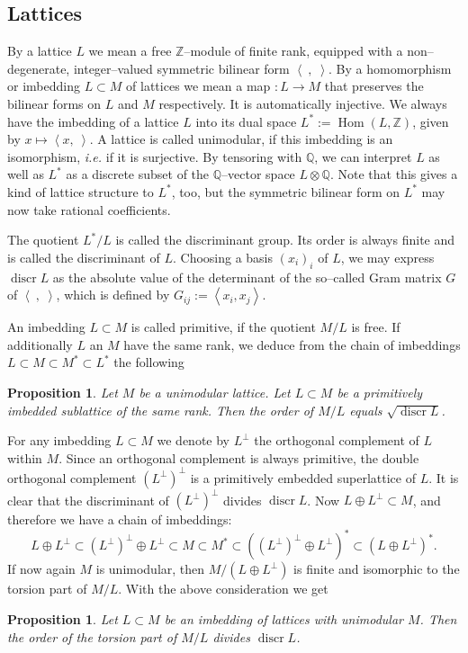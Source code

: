 \documentclass{amsart}
\DeclareMathOperator{\Hom}{Hom}
\DeclareMathOperator{\discr}{discr}
\newcommand{\ie}{{\it i.e. }}
\newcommand{\coloneqq}{:=}
\newcommand{\Q}{\mathbb{Q}}
\newcommand{\Z}{\mathbb{Z}}
\theoremstyle{plain}
\newtheorem{proposition}[theorem]{Proposition}
\theoremstyle{definition}
\theoremstyle{remark}
\begin{document}
\subsection{Lattices}\label{latticeSubsection} By a lattice $L$ we mean a free $\Z$--module of finite rank, equipped with a non--degenerate, integer--valued symmetric bilinear form $\left<\ ,\;\right>$. By a homomorphism or imbedding $L\subset M$ of lattices we mean a map $:L\rightarrow M$ that preserves the bilinear forms on $L$ and $M$ respectively. It is automatically injective. We always have the imbedding of a lattice $L$ into its dual space $L^*\coloneqq \Hom(L,\Z)$, given by $x \mapsto \left<x,\ \right>$. A lattice is called unimodular, if this imbedding is an isomorphism, \ie if it is surjective. By tensoring with $\Q$, we can interpret $L$ as well as $L^*$ as a discrete subset of the $\Q$--vector space $L\otimes \Q$. Note that this gives a kind of lattice structure to $L^*$, too, but the symmetric bilinear form on $L^*$ may now take rational coefficients.

The quotient $L^*/L$ is called the discriminant group. Its order is always finite and is called the discriminant of $L$.
Choosing a basis $(x_i)_i$ of $L$, we may express $\discr L$ as the absolute value of the determinant of the so--called Gram matrix $G$ of $\left<\ ,\;\right>$, which is defined by $G_{ij}\coloneqq \left<x_i,x_j\right>$. 

An imbedding $L\subset M$ is called primitive, if the quotient $M/L$ is free. If additionally $L$ an $M$ have the same rank, we deduce from the chain of imbeddings $L\subset M \subset M^* \subset L^*$ the following
\begin{proposition} \label{squareDiscr}Let $M$ be a unimodular lattice. Let $L\subset M$ be a primitively imbedded sublattice of the same rank. Then the order of $M/L$ equals $\sqrt{\discr L}$.
\end{proposition}
For any imbedding $L\subset M$ we denote by $L^\perp$ the orthogonal complement of $L$ within $M$. Since an orthogonal complement is always primitive, the double orthogonal complement $ (L^\perp)^\perp$ is a primitively embedded superlattice of $L$. It is clear that the discriminant of $ (L^\perp)^\perp$  divides $\discr L$. Now $L\oplus L^\perp\subset M$, and therefore we have a chain of imbeddings:
$$
L\oplus L^\perp \subset  (L^\perp)^\perp \oplus L^\perp\subset M \subset M^* \subset \left((L^\perp)^\perp \oplus L^\perp\right)^*  \subset \left(L \oplus L^\perp\right)^*.
$$
If now again $M$ is unimodular, then $M/(L\oplus L^\perp)$ is finite and isomorphic to the torsion part of $M/L$. With the above consideration we get
\begin{proposition}\label{TorsionQuotient} Let $L\subset M$ be an imbedding of lattices with unimodular $M$. Then the order of the torsion part of $M/L$ 
divides $\discr L$.
\end{proposition}
\end{document}
